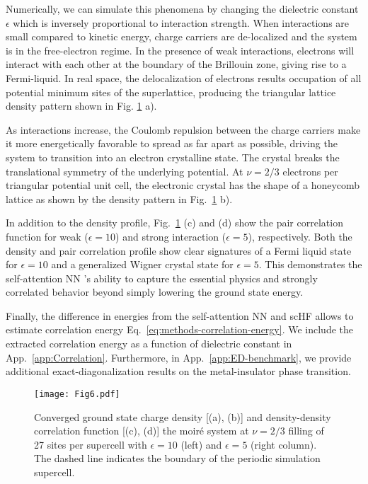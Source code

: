 \documentclass[
 reprint,
 amsmath,amssymb,
 aps, prx,
floatfix,longbibliography,
]{revtex4-2}
\newcommand{\FNN}{self-attention NN }
\begin{document}
Numerically, we can simulate this phenomena by changing the dielectric constant $\epsilon$ which is inversely proportional to interaction strength. When interactions are small compared to kinetic energy, charge carriers are de-localized and the system is in the free-electron regime. In the presence of weak interactions, electrons will interact with each other at the boundary of the Brillouin zone, giving rise to a Fermi-liquid. In real space, the delocalization of electrons results occupation of all potential minimum sites of the superlattice, producing the triangular lattice density pattern shown in Fig. \ref{fig:6} a). 

As interactions increase, the Coulomb repulsion between the charge carriers make it more energetically favorable to spread as far apart as possible, driving the system to transition into an electron crystalline state. The crystal breaks the translational symmetry of the underlying potential. At $\nu = 2/3$ electrons per triangular potential unit cell, the electronic crystal has the shape of a honeycomb lattice as shown by the density pattern in Fig.~\ref{fig:6} b). 


In addition to the density profile, Fig.~\ref{fig:6} (c) and (d) show the pair correlation function for weak ($\epsilon=10$) and strong interaction ($\epsilon=5$), respectively. 
Both the density and pair correlation profile show clear signatures of a Fermi liquid state for $\epsilon=10$ and a generalized Wigner crystal state for $\epsilon=5$. 
This demonstrates the \FNN's ability to capture the essential physics and strongly correlated behavior beyond simply lowering the ground state energy. 

Finally, the difference in energies from the \FNN and scHF allows to estimate correlation energy Eq.~\eqref{eq:methods-correlation-energy}. We include the extracted correlation energy as a function of dielectric constant in App.~\ref{app:Correlation}. 
 Furthermore, in App.~\ref{app:ED-benchmark}, we provide additional exact-diagonalization results on the metal-insulator phase transition. 




\begin{figure}
    \centering
    \texttt{[image: Fig6.pdf]}
    \caption{Converged ground state charge density [(a), (b)] and density-density correlation function [(c), (d)] the moir\'e system at $\nu = 2/3$ filling of 27 sites per supercell with $\epsilon = 10$ (left) and $\epsilon = 5$ (right column).
    The dashed line indicates the boundary of the periodic simulation supercell.}
    \label{fig:6}
\end{figure}
\end{document}
